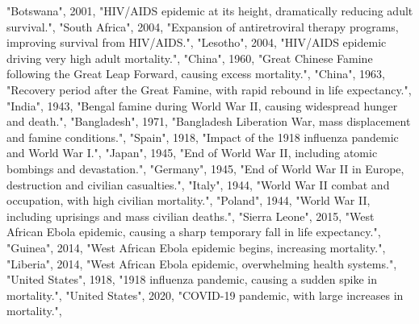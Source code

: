 \documentclass[
  11pt,
]{article}
\newenvironment{Shaded}{\begin{snugshade}}{\end{snugshade}}
\newcommand{\DecValTok}[1]{\textcolor[rgb]{0.00,0.00,0.81}{#1}}
\newcommand{\NormalTok}[1]{#1}
\newcommand{\StringTok}[1]{\textcolor[rgb]{0.31,0.60,0.02}{#1}}
\begin{document}
\begin{Shaded}
\begin{Highlighting}[]
  \StringTok{"Botswana"}\NormalTok{, }\DecValTok{2001}\NormalTok{, }\StringTok{"HIV/AIDS epidemic at its height, dramatically reducing adult survival."}\NormalTok{,}
  \StringTok{"South Africa"}\NormalTok{, }\DecValTok{2004}\NormalTok{, }\StringTok{"Expansion of antiretroviral therapy programs, improving survival from HIV/AIDS."}\NormalTok{,}
  \StringTok{"Lesotho"}\NormalTok{, }\DecValTok{2004}\NormalTok{, }\StringTok{"HIV/AIDS epidemic driving very high adult mortality."}\NormalTok{,}
  \StringTok{"China"}\NormalTok{, }\DecValTok{1960}\NormalTok{, }\StringTok{"Great Chinese Famine following the Great Leap Forward, causing excess mortality."}\NormalTok{,}
  \StringTok{"China"}\NormalTok{, }\DecValTok{1963}\NormalTok{, }\StringTok{"Recovery period after the Great Famine, with rapid rebound in life expectancy."}\NormalTok{,}
  \StringTok{"India"}\NormalTok{, }\DecValTok{1943}\NormalTok{, }\StringTok{"Bengal famine during World War II, causing widespread hunger and death."}\NormalTok{,}
  \StringTok{"Bangladesh"}\NormalTok{, }\DecValTok{1971}\NormalTok{, }\StringTok{"Bangladesh Liberation War, mass displacement and famine conditions."}\NormalTok{,}
  \StringTok{"Spain"}\NormalTok{, }\DecValTok{1918}\NormalTok{, }\StringTok{"Impact of the 1918 influenza pandemic and World War I."}\NormalTok{,}
  \StringTok{"Japan"}\NormalTok{, }\DecValTok{1945}\NormalTok{, }\StringTok{"End of World War II, including atomic bombings and devastation."}\NormalTok{,}
  \StringTok{"Germany"}\NormalTok{, }\DecValTok{1945}\NormalTok{, }\StringTok{"End of World War II in Europe, destruction and civilian casualties."}\NormalTok{,}
  \StringTok{"Italy"}\NormalTok{, }\DecValTok{1944}\NormalTok{, }\StringTok{"World War II combat and occupation, with high civilian mortality."}\NormalTok{,}
  \StringTok{"Poland"}\NormalTok{, }\DecValTok{1944}\NormalTok{, }\StringTok{"World War II, including uprisings and mass civilian deaths."}\NormalTok{,}
  \StringTok{"Sierra Leone"}\NormalTok{, }\DecValTok{2015}\NormalTok{, }\StringTok{"West African Ebola epidemic, causing a sharp temporary fall in life expectancy."}\NormalTok{,}
  \StringTok{"Guinea"}\NormalTok{, }\DecValTok{2014}\NormalTok{, }\StringTok{"West African Ebola epidemic begins, increasing mortality."}\NormalTok{,}
  \StringTok{"Liberia"}\NormalTok{, }\DecValTok{2014}\NormalTok{, }\StringTok{"West African Ebola epidemic, overwhelming health systems."}\NormalTok{,}
  \StringTok{"United States"}\NormalTok{, }\DecValTok{1918}\NormalTok{, }\StringTok{"1918 influenza pandemic, causing a sudden spike in mortality."}\NormalTok{,}
  \StringTok{"United States"}\NormalTok{, }\DecValTok{2020}\NormalTok{, }\StringTok{"COVID{-}19 pandemic, with large increases in mortality."}\NormalTok{,}

\end{Highlighting}
\end{Shaded}
\end{document}
